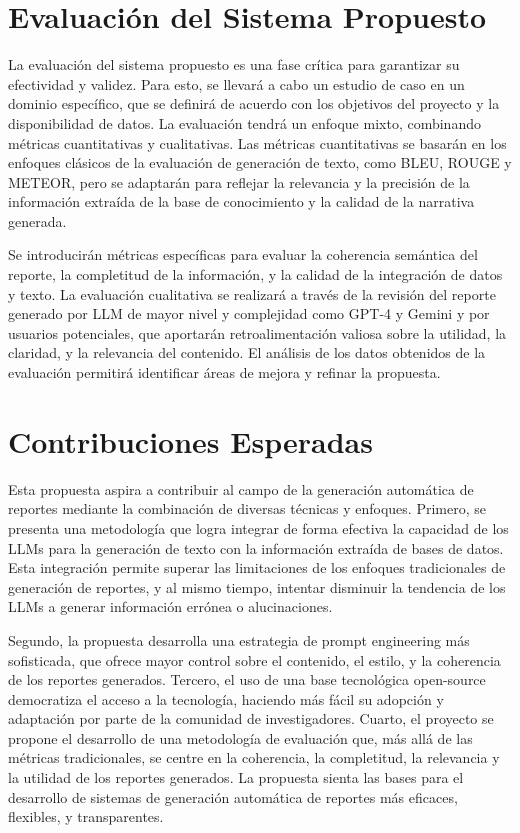 \section{Evaluación del Sistema Propuesto}

La evaluación del sistema propuesto es una fase crítica para garantizar su efectividad y validez. Para esto, se llevará a cabo un estudio de caso en un dominio específico, que se definirá de acuerdo con los objetivos del proyecto y la disponibilidad de datos. La evaluación tendrá un enfoque mixto, combinando métricas cuantitativas y cualitativas. Las métricas cuantitativas se basarán en los enfoques clásicos de la evaluación de generación de texto, como BLEU, ROUGE y METEOR, pero se adaptarán para reflejar la relevancia y la precisión de la información extraída de la base de conocimiento y la calidad de la narrativa generada. 

Se introducirán métricas específicas para evaluar la coherencia semántica del reporte, la completitud de la información, y la calidad de la integración de datos y texto. La evaluación cualitativa se realizará a través de la revisión del reporte generado por LLM de mayor nivel y complejidad como GPT-4 y Gemini y por usuarios potenciales, que aportarán retroalimentación valiosa sobre la utilidad, la claridad, y la relevancia del contenido. El análisis de los datos obtenidos de la evaluación permitirá identificar áreas de mejora y refinar la propuesta.


\section{Contribuciones Esperadas}

Esta propuesta aspira a contribuir al campo de la generación automática de reportes mediante la combinación de diversas técnicas y enfoques. Primero, se presenta una metodología que logra integrar de forma efectiva la capacidad de los LLMs para la generación de texto con la información extraída de bases de datos. Esta integración permite superar las limitaciones de los enfoques tradicionales de generación de reportes, y al mismo tiempo, intentar disminuir la tendencia de los LLMs a generar información errónea o alucinaciones.

Segundo, la propuesta desarrolla una estrategia de prompt engineering más sofisticada, que ofrece mayor control sobre el contenido, el estilo, y la coherencia de los reportes generados. Tercero, el uso de una base tecnológica open-source democratiza el acceso a la tecnología, haciendo más fácil su adopción y adaptación por parte de la comunidad de investigadores. Cuarto, el proyecto se propone el desarrollo de una metodología de evaluación que, más allá de las métricas tradicionales, se centre en la coherencia, la completitud, la relevancia y la utilidad de los reportes generados. La propuesta sienta las bases para el desarrollo de sistemas de generación automática de reportes más eficaces, flexibles, y transparentes.